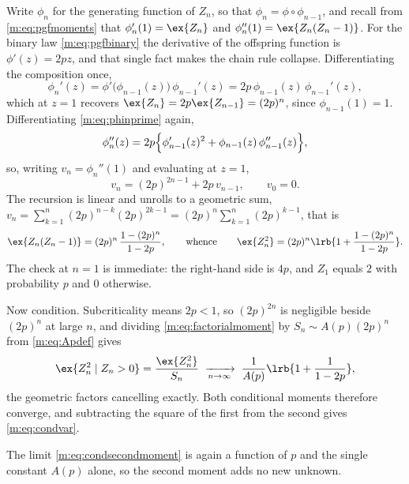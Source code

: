 Write $\phi_n$ for the generating function of $Z_n$, so that $\phi_n=\phi\circ
\phi_{n-1}$, and recall from \cref{m:eq:pgfmoments} that $\phi_n'(1)=\ex{Z_n}$ and
$\phi_n''(1)=\ex{Z_n(Z_n-1)}$. For the binary law \cref{m:eq:pgfbinary} the
derivative of the offspring function is $\phi'(z)=2pz$, and that single fact makes
the chain rule collapse. Differentiating the composition once,
\begin{equation}
\label{m:eq:phinprime}
\phi_n'(z) = \phi'\bigl(\phi_{n-1}(z)\bigr)\,\phi_{n-1}'(z)
= 2p\,\phi_{n-1}(z)\,\phi_{n-1}'(z),
\end{equation}
which at $z=1$ recovers $\ex{Z_n}=2p\ex{Z_{n-1}}=(2p)^n$, since $\phi_{n-1}(1)=1$.
Differentiating \cref{m:eq:phinprime} again,
\begin{equation}
\label{m:eq:phinsecond}
\phi_n''(z)
= 2p\Bigl\{\phi_{n-1}'(z)^2 + \phi_{n-1}(z)\,\phi_{n-1}''(z)\Bigr\},
\end{equation}
so, writing $v_n=\phi_n''(1)$ and evaluating at $z=1$,
\begin{equation}
\label{m:eq:vnrecursion}
v_n = (2p)^{2n-1} + 2p\,v_{n-1},
\qquad v_0 = 0 .
\end{equation}
The recursion is linear and unrolls to a geometric sum,
$v_n=\sum_{k=1}^{n}(2p)^{n-k}(2p)^{2k-1}=(2p)^n\sum_{k=1}^{n}(2p)^{k-1}$, that is
\begin{equation}
\label{m:eq:factorialmoment}
\ex{Z_n(Z_n-1)} = (2p)^n\,\frac{1-(2p)^n}{1-2p},
\qquad\text{whence}\qquad
\ex{Z_n^2} = (2p)^n\lrb{1+\frac{1-(2p)^n}{1-2p}} .
\end{equation}
The check at $n=1$ is immediate: the right-hand side is $4p$, and $Z_1$ equals
$2$ with probability $p$ and $0$ otherwise.

Now condition. Subcriticality means $2p<1$, so $(2p)^{2n}$ is negligible beside
$(2p)^n$ at large $n$, and dividing \cref{m:eq:factorialmoment} by
$S_n\sim A(p)(2p)^n$ from \cref{m:eq:Apdef} gives
\begin{equation}
\label{m:eq:condsecondmoment}
\ex{Z_n^2\mid Z_n>0}
= \frac{\ex{Z_n^2}}{S_n}
\;\xrightarrow[n\to\infty]{}\;
\frac{1}{A(p)}\lrb{1+\frac{1}{1-2p}} ,
\end{equation}
the geometric factors cancelling exactly. Both conditional moments therefore
converge, and subtracting the square of the first from the second gives
\cref{m:eq:condvar}.

The limit \cref{m:eq:condsecondmoment} is again a function of $p$ and the single
constant $A(p)$ alone, so the second moment adds no new unknown.
